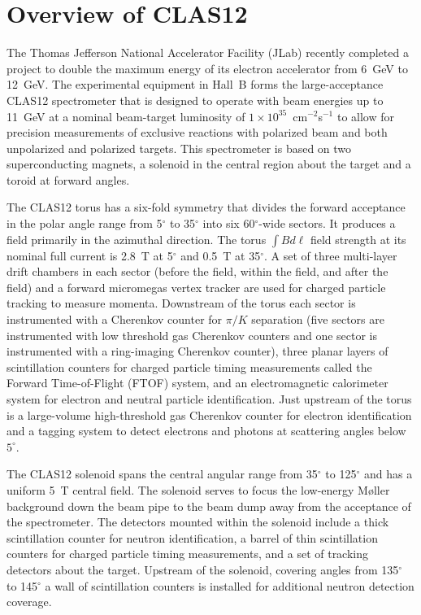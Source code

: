 \documentclass{elsart}
\begin{document}
\vfil
\eject

\section{Overview of CLAS12}

The Thomas Jefferson National Accelerator Facility (JLab) recently completed a project to 
double the maximum energy of its electron accelerator from 6~GeV to 12~GeV. The experimental 
equipment in Hall~B forms the large-acceptance CLAS12 spectrometer that is designed to operate 
with beam energies up to 11~GeV at a nominal beam-target luminosity of 
$1 \times 10^{35}$~cm$^{-2}$s$^{-1}$ to allow for precision measurements of exclusive 
reactions with polarized beam and both unpolarized and polarized targets. This spectrometer is 
based on two superconducting magnets, a solenoid in the central region about the target and a 
toroid at forward angles.

The CLAS12 torus has a six-fold symmetry that divides the forward acceptance in the polar angle
range from 5$^\circ$ to 35$^\circ$ into six 60$^\circ$-wide sectors. It produces a field primarily in
the azimuthal direction. The torus $\int \!B d\ell$ field strength at its nominal full current is 2.8~T
at 5$^\circ$ and 0.5~T at 35$^\circ$. A set of three multi-layer drift chambers in each sector (before
the field, within the field, and after the field) and a forward micromegas vertex tracker are used for
charged particle tracking to measure momenta. Downstream of the torus each sector is instrumented
with a Cherenkov counter for $\pi/K$ separation (five sectors are instrumented with low threshold
gas Cherenkov counters and one sector is instrumented with a ring-imaging Cherenkov counter), three
planar layers of scintillation counters for charged particle timing measurements called the Forward
Time-of-Flight (FTOF) system, and an electromagnetic calorimeter system for electron and neutral
particle identification. Just upstream of the torus is a large-volume high-threshold gas Cherenkov
counter for electron identification and a tagging system to detect electrons and photons at scattering
angles below $5^\circ$.

The CLAS12 solenoid spans the central angular range from 35$^\circ$ to 125$^\circ$ and has a 
uniform 5~T central field. The solenoid serves to focus the low-energy M{\o}ller background down 
the beam pipe to the beam dump away from the acceptance of the spectrometer. The detectors mounted 
within the solenoid include a thick scintillation counter for neutron identification, a barrel of thin
scintillation counters for charged particle timing measurements, and a set of tracking detectors about the
target. Upstream of the solenoid, covering angles from 135$^\circ$ to 145$^\circ$ a wall of scintillation
counters is installed for additional neutron detection coverage.
\end{document}
